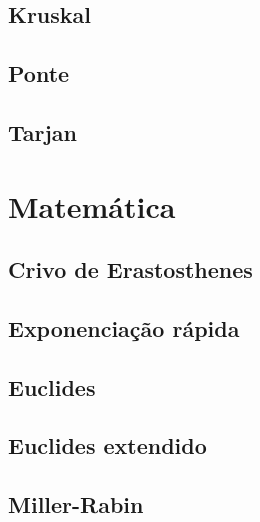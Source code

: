 \documentclass[12pt, a4paper, twoside]{article}
\begin{document}
\subsection{Kruskal}


\subsection{Ponte}


\subsection{Tarjan}




%
%

\section{Matemática}

\subsection{Crivo de Erastosthenes}


\subsection{Exponenciação rápida}


\subsection{Euclides}


\subsection{Euclides extendido}


\subsection{Miller-Rabin}

\end{document}
